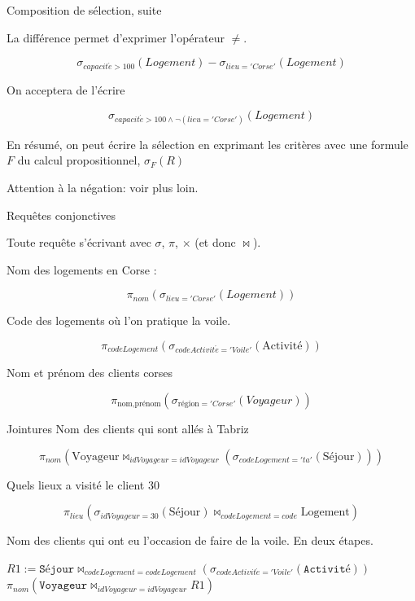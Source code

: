 \begin{frame}{Composition de sélection, suite }

La différence permet d'exprimer l'opérateur $\not=$.

     $$\sigma_{capacit\acute{e}>100}(Logement) - \sigma_{lieu='Corse'}(Logement) $$
     
\vfill

On acceptera de l'écrire

   $$\sigma_{capacit\acute{e}>100 \land \neg (lieu ='Corse')}(Logement) $$

\vfill

En résumé, on peut écrire la sélection en exprimant les critères avec une formule
$F$ du calcul propositionnel,  $\sigma_F(R)$


\vfill

\alert{Attention} à la négation: voir plus loin.
\end{frame}


\begin{frame}{Requêtes conjonctives}

Toute requête s'écrivant avec $\sigma$, $\pi$, $\times$ (et donc $\Join$).

\vfill
Nom des logements en Corse :  
  
    $$\pi_{nom}(\sigma_{lieu='Corse'}(Logement))$$
    
\vfill

Code des logements où l'on pratique la voile.
       
    $$\pi_{codeLogement}(\sigma_{codeActivit\acute{e}='Voile'}(\text{Activité}))$$

\vfill

Nom et prénom des clients corses
          
    $$\pi_{\text{nom,prénom}}(\sigma_{\text{région}='Corse'}(Voyageur))$$
\end{frame}



\begin{frame}{Jointures}
Nom des clients qui sont allés à Tabriz
  
    $$ \pi_{nom} (\text{Voyageur} \Join_{idVoyageur=idVoyageur} (\sigma_{codeLogement='ta'} (\text{Séjour})))$$

\vfill
Quels lieux a visité le client 30
    
    $$\pi_{lieu} (\sigma_{idVoyageur=30} (\text{Séjour}) \Join_{codeLogement=code} \text{Logement})$$
 
\vfill

Nom des clients qui ont eu l'occasion de faire de la voile. En deux étapes.

\vfill
$R1 :=  \texttt{Séjour} \Join_{codeLogement=codeLogement} (\sigma_{codeActivit\acute{e}='Voile'}(\texttt{Activité}))$
\vfill
$\pi_{nom} (\texttt{Voyageur} \Join_{idVoyageur=idVoyageur} R1)$
   
\end{frame}




